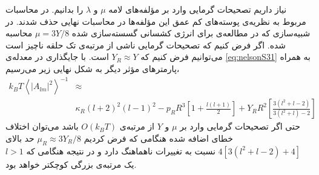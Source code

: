 نیاز داریم تصحیحات گرمایی وارد بر مؤلفه‌های لامه $\mu$
و $\lambda$ 
را بدانیم. در محاسبات مربوط به نظریه‌ی پوسته‌های کم عمق این مؤلفه‌ها در محاسبات نهایی حذف شدند. در شبیه‌سازی که در مطالعه‌ی 
\cite{gomppernelson2012}
برای انرژی کشسانی گسسته‌سازی شده $\mu=3Y/8$
محاسبه شده. اگر فرض کنیم که تصحیحات گرمایی ناشی از مرتبه‌ی تک حلقه ناچیز است می‌توانیم فرض کنیم که $Y_R\approx Y$ 
است. با جایگذاری در معدله‌ی \ref{eq:nelsonS31} به همراه پارمتر‌های مؤثر دیگر به شکل نهایی زیر می‌رسیم،
\begin{equation}
\begin{aligned}
k_BT\left\langle|A_{lm}|^2\right\rangle^{-1}&\approx\\
&\kappa_R(l+2)^2(l-1)^2-p_RR^3\left[1+\frac{l(l+1)}{2}\right]+Y_RR^2\left[\frac{3(l^2+l-2)}{3(l^2+l)-2}\right]
\label{eq:nelsonS32}
\end{aligned}
\end{equation} 
حتی اگر تصحیحات گرمایی وارد بر $\mu$
و $Y$
از مرتبه‌ی $O(k_BT)$ 
باشد می‌توان اختلاف خطای اضافه شده هنگامی که فرض کردیم $\mu_R\approx3Y_R/8$
حد بالای 
$4[3(l^2+l-2)+4]$
نسبت به تغییرات ناهماهنگ دارد و در نتیجه هنگامی که $l>1$
یک مرتبه‌ی بزرگی کوچکتر خواهد بود.


% 
%


	        
	       